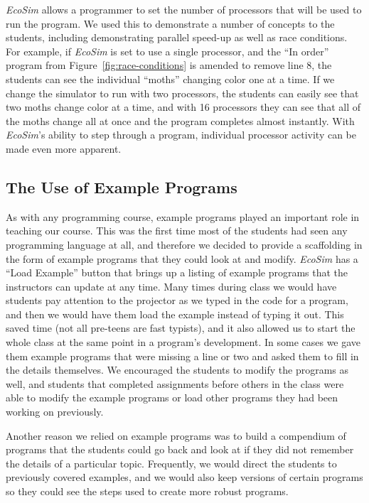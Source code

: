 \documentclass{sig-alternate}
\begin{document}
\emph{EcoSim} allows a programmer to set the number of processors that will be used to run the
program. We used this to demonstrate a number of concepts to the students, including demonstrating
parallel speed-up as well as race conditions.  For example, if \emph{EcoSim} is set to use a single
processor, and the ``In order'' program from Figure~\ref{fig:race-conditions} is amended to remove
line 8, the students can see the individual ``moths'' changing color one at a time.  If we change
the simulator to run with two processors, the students can easily see that two moths change color
at a time, and with 16 processors they can see that all of the moths change all at once and the
program completes almost instantly.  With \emph{EcoSim}'s ability to step through a program, 
individual processor activity can be made even more apparent.

\subsection{The Use of Example Programs}
As with any programming course, example programs played an important role in teaching our course.
This was the first time most of the students had seen any programming language at all, and
therefore we decided to provide a scaffolding in the form of example programs that they could
look at and modify.  \emph{EcoSim} has a ``Load Example'' button that brings up a listing of
example programs that the instructors can update at any time.  Many times during class we would
have students pay attention to the projector as we typed in the code for a program, and then we
would have them load the example instead of typing it out.  This saved time (not all pre-teens
are fast typists), and it also allowed us to start the whole class at the same point in a program's
development.  In some cases we gave them example programs that were missing a line or two and
asked them to fill in the details themselves.  We encouraged the students to modify the programs
as well, and students that completed assignments before others in the class were able to modify
the example programs or load other programs they had been working on previously.

Another reason we relied on example programs was to build a compendium of programs that the students
could go back and look at if they did not remember the details of a particular topic.  Frequently,
we would direct the students to previously covered examples, and we would also keep versions of 
certain programs so they could see the steps used to create more robust programs.
\end{document}
